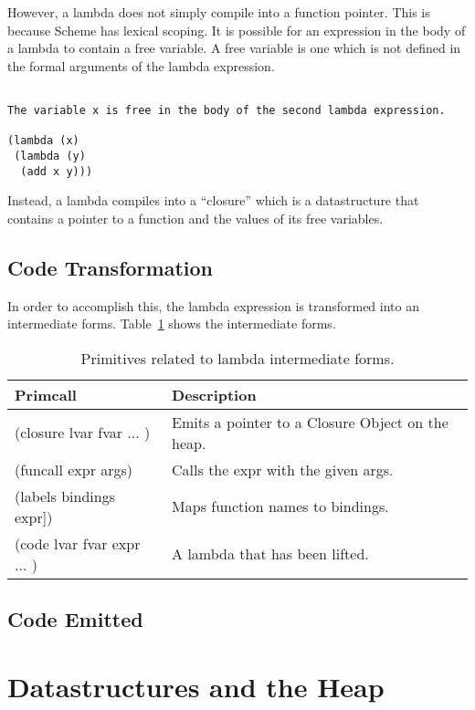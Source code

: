 \documentclass{article}
\begin{document}
However, a lambda does not simply compile into a function pointer. This is because Scheme has lexical scoping. It is possible for an expression in the body of a lambda to contain a free variable. A free variable is one which is not defined in the formal arguments of the lambda expression. 

\begin{verbatim}

The variable x is free in the body of the second lambda expression. 

(lambda (x) 
 (lambda (y) 
  (add x y)))

\end{verbatim}

Instead, a lambda compiles into a ``closure'' which is a datastructure that contains a pointer to a function and the values of its free variables.

\subsection{Code Transformation}

In order to accomplish this, the lambda expression is transformed into an intermediate forms. Table~\ref{tab:lambda_intermediate} shows the intermediate forms. 

\begin{table}[ht]
  \centering
\begin{tabular}{ l l }
  \toprule
  Primcall & Description \\ \hline
  \midrule
  (closure lvar fvar ... ) & Emits a pointer to a Closure Object on the heap.  \\
  (funcall expr args) & Calls the expr with the given args.  \\
  (labels bindings expr]) & Maps function names to bindings. \\
  (code lvar fvar expr ... ) & A lambda that has been lifted.  \\
  \bottomrule
\end{tabular}
\caption{Primitives related to lambda intermediate forms.} \label{tab:lambda_intermediate}
\end{table}

\subsection{Code Emitted}




\section{Datastructures and the Heap}
\end{document}
